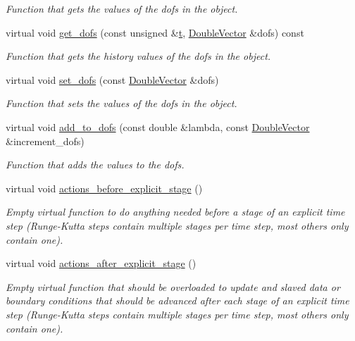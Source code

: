\begin{DoxyCompactItemize}
\begin{DoxyCompactList}\small\item\em Function that gets the values of the dofs in the object. \end{DoxyCompactList}\item 
virtual void \hyperlink{classoomph_1_1ExplicitTimeSteppableObject_a370d8d077bb5e07290f4c2f31183d8d2}{get\+\_\+dofs} (const unsigned \&\hyperlink{cfortran_8h_af6f0bd3dc13317f895c91323c25c2b8f}{t}, \hyperlink{classoomph_1_1DoubleVector}{Double\+Vector} \&dofs) const
\begin{DoxyCompactList}\small\item\em Function that gets the history values of the dofs in the object. \end{DoxyCompactList}\item 
virtual void \hyperlink{classoomph_1_1ExplicitTimeSteppableObject_a76a8d64f2d6aa8de955b44c86e9b3ecb}{set\+\_\+dofs} (const \hyperlink{classoomph_1_1DoubleVector}{Double\+Vector} \&dofs)
\begin{DoxyCompactList}\small\item\em Function that sets the values of the dofs in the object. \end{DoxyCompactList}\item 
virtual void \hyperlink{classoomph_1_1ExplicitTimeSteppableObject_a00f10d9ad6de867dd72ba175a5f0ec89}{add\+\_\+to\+\_\+dofs} (const double \&lambda, const \hyperlink{classoomph_1_1DoubleVector}{Double\+Vector} \&increment\+\_\+dofs)
\begin{DoxyCompactList}\small\item\em Function that adds the values to the dofs. \end{DoxyCompactList}\item 
virtual void \hyperlink{classoomph_1_1ExplicitTimeSteppableObject_a74eb2ebff3fc3066edccdfe4d3b6bc07}{actions\+\_\+before\+\_\+explicit\+\_\+stage} ()
\begin{DoxyCompactList}\small\item\em Empty virtual function to do anything needed before a stage of an explicit time step (Runge-\/\+Kutta steps contain multiple stages per time step, most others only contain one). \end{DoxyCompactList}\item 
virtual void \hyperlink{classoomph_1_1ExplicitTimeSteppableObject_ad1eb700abad36e868a84c475f9866b7d}{actions\+\_\+after\+\_\+explicit\+\_\+stage} ()
\begin{DoxyCompactList}\small\item\em Empty virtual function that should be overloaded to update and slaved data or boundary conditions that should be advanced after each stage of an explicit time step (Runge-\/\+Kutta steps contain multiple stages per time step, most others only contain one). \end{DoxyCompactList}\item 

\end{DoxyCompactItemize}
